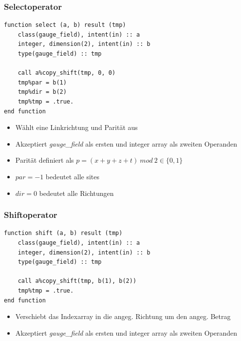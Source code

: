 \documentclass[10pt]{beamer}
\begin{document}
\begin{frame}[fragile]
    \frametitle{Selectoperator}
    \begin{minipage}{0.48\linewidth}
    \begin{lstlisting}
function select (a, b) result (tmp)
    class(gauge_field), intent(in) :: a
    integer, dimension(2), intent(in) :: b
    type(gauge_field) :: tmp
        
    call a%copy_shift(tmp, 0, 0)
    tmp%par = b(1)
    tmp%dir = b(2)
    tmp%tmp = .true.
end function
\end{lstlisting}
\end{minipage}
    \hfill
    \begin{minipage}{0.48\linewidth}
        \begin{itemize}
        	\item Wählt eine Linkrichtung und Parität aus
        	\item Akzeptiert \emph{gauge\_field} als ersten und integer array als zweiten Operanden
        	\item Parität definiert als $p = (x+y+z+t)\ mod\ 2 \in \{0, 1\}$
        	\item $par = -1$ bedeutet alle sites
        	\item $dir = 0$ bedeutet alle Richtungen
        \end{itemize}
    \end{minipage}
\end{frame}

\begin{frame}[fragile]
    \frametitle{Shiftoperator}
    \begin{minipage}{0.48\linewidth}
    \begin{lstlisting}
function shift (a, b) result (tmp)
    class(gauge_field), intent(in) :: a
    integer, dimension(2), intent(in) :: b
    type(gauge_field) :: tmp

    call a%copy_shift(tmp, b(1), b(2))
    tmp%tmp = .true.
end function
\end{lstlisting}
\end{minipage}
    \hfill
    \begin{minipage}{0.48\linewidth}
        \begin{itemize}
        	\item Verschiebt das Indexarray in die angeg. Richtung um den angeg. Betrag
        	\item Akzeptiert \emph{gauge\_field} als ersten und integer array als zweiten Operanden
        \end{itemize}
    \end{minipage}
\end{frame}
\end{document}
